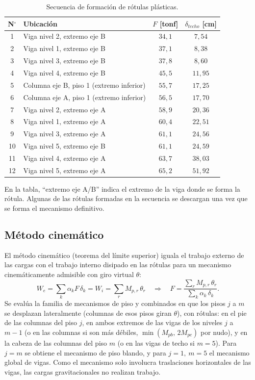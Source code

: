 \documentclass[11pt,letterpaper]{article}
\begin{document}
\begin{table}[H]
\centering
\caption{Secuencia de formación de rótulas plásticas.}
\begin{tabular}{clcc}
\toprule
N$^\circ$ & Ubicación & $F$ [tonf] & $\delta_{techo}$ [cm] \\
\midrule
1 & Viga nivel 2, extremo eje B & $34{,}1$ & $7{,}54$ \\
2 & Viga nivel 1, extremo eje B & $37{,}1$ & $8{,}38$ \\
3 & Viga nivel 3, extremo eje B & $37{,}8$ & $8{,}60$ \\
4 & Viga nivel 4, extremo eje B & $45{,}5$ & $11{,}95$ \\
5 & Columna eje B, piso 1 (extremo inferior) & $55{,}7$ & $17{,}25$ \\
6 & Columna eje A, piso 1 (extremo inferior) & $56{,}5$ & $17{,}70$ \\
7 & Viga nivel 2, extremo eje A & $58{,}9$ & $20{,}36$ \\
8 & Viga nivel 1, extremo eje A & $60{,}4$ & $22{,}51$ \\
9 & Viga nivel 3, extremo eje A & $61{,}1$ & $24{,}56$ \\
10 & Viga nivel 5, extremo eje B & $61{,}1$ & $24{,}59$ \\
11 & Viga nivel 4, extremo eje A & $63{,}7$ & $38{,}03$ \\
12 & Viga nivel 5, extremo eje A & $65{,}2$ & $51{,}92$ \\
\bottomrule
\end{tabular}
\end{table}
En la tabla, ``extremo eje A/B'' indica el extremo de la viga donde se forma la rótula. Algunas de las rótulas
formadas en la secuencia se descargan una vez que se forma el mecanismo definitivo.

\subsection{Método cinemático}
El método cinemático (teorema del límite superior) iguala el trabajo externo de las cargas con el trabajo interno
disipado en las rótulas para un mecanismo cinemáticamente admisible con giro virtual $\theta$:
\[
W_e = \sum_k \alpha_k F\,\delta_k = W_i = \sum_r M_{p,r}\,\theta_r
\quad\Rightarrow\quad
F = \frac{\sum_r M_{p,r}\,\theta_r}{\sum_k \alpha_k\,\delta_k}.
\]
Se evalúa la familia de mecanismos de piso y combinados en que los pisos $j$ a $m$ se desplazan lateralmente
(columnas de esos pisos giran $\theta$), con rótulas: en el pie de las columnas del piso $j$, en ambos extremos de
las vigas de los niveles $j$ a $m-1$ (o en las columnas si son más débiles, $\min(M_{pb},\,2M_{pc})$ por nudo),
y en la cabeza de las columnas del piso $m$ (o en las vigas de techo si $m = 5$). Para $j = m$ se obtiene el
mecanismo de piso blando, y para $j=1,\ m=5$ el mecanismo global de vigas. Como el mecanismo solo
involucra traslaciones horizontales de las vigas, las cargas gravitacionales no realizan trabajo.
\end{document}
